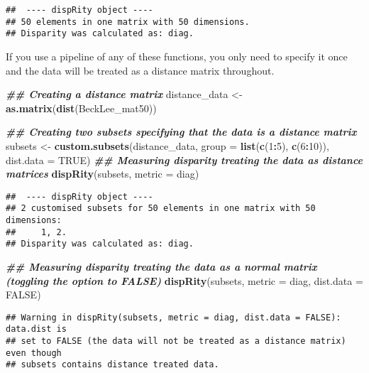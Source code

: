 \documentclass[
]{book}
\newenvironment{Shaded}{\begin{snugshade}}{\end{snugshade}}
\newcommand{\AttributeTok}[1]{\textcolor[rgb]{0.13,0.29,0.53}{#1}}
\newcommand{\ConstantTok}[1]{\textcolor[rgb]{0.56,0.35,0.01}{#1}}
\newcommand{\DecValTok}[1]{\textcolor[rgb]{0.00,0.00,0.81}{#1}}
\newcommand{\DocumentationTok}[1]{\textcolor[rgb]{0.56,0.35,0.01}{\textbf{\textit{#1}}}}
\newcommand{\FunctionTok}[1]{\textcolor[rgb]{0.13,0.29,0.53}{\textbf{#1}}}
\newcommand{\NormalTok}[1]{#1}
\newcommand{\OtherTok}[1]{\textcolor[rgb]{0.56,0.35,0.01}{#1}}
\newcommand{\SpecialCharTok}[1]{\textcolor[rgb]{0.81,0.36,0.00}{\textbf{#1}}}
\begin{document}
\begin{verbatim}
##  ---- dispRity object ---- 
## 50 elements in one matrix with 50 dimensions.
## Disparity was calculated as: diag.
\end{verbatim}

If you use a pipeline of any of these functions, you only need to specify it once and the data will be treated as a distance matrix throughout.

\begin{Shaded}
\begin{Highlighting}[]
\DocumentationTok{\#\# Creating a distance matrix}
\NormalTok{distance\_data }\OtherTok{\textless{}{-}} \FunctionTok{as.matrix}\NormalTok{(}\FunctionTok{dist}\NormalTok{(BeckLee\_mat50))}

\DocumentationTok{\#\# Creating two subsets specifying that the data is a distance matrix}
\NormalTok{subsets }\OtherTok{\textless{}{-}} \FunctionTok{custom.subsets}\NormalTok{(distance\_data, }\AttributeTok{group =} \FunctionTok{list}\NormalTok{(}\FunctionTok{c}\NormalTok{(}\DecValTok{1}\SpecialCharTok{:}\DecValTok{5}\NormalTok{), }\FunctionTok{c}\NormalTok{(}\DecValTok{6}\SpecialCharTok{:}\DecValTok{10}\NormalTok{)), }\AttributeTok{dist.data =} \ConstantTok{TRUE}\NormalTok{)}
\DocumentationTok{\#\# Measuring disparity treating the data as distance matrices}
\FunctionTok{dispRity}\NormalTok{(subsets, }\AttributeTok{metric =}\NormalTok{ diag)}
\end{Highlighting}
\end{Shaded}

\begin{verbatim}
##  ---- dispRity object ---- 
## 2 customised subsets for 50 elements in one matrix with 50 dimensions:
##     1, 2.
## Disparity was calculated as: diag.
\end{verbatim}

\begin{Shaded}
\begin{Highlighting}[]
\DocumentationTok{\#\# Measuring disparity treating the data as a normal matrix (toggling the option to FALSE)}
\FunctionTok{dispRity}\NormalTok{(subsets, }\AttributeTok{metric =}\NormalTok{ diag, }\AttributeTok{dist.data =} \ConstantTok{FALSE}\NormalTok{)}
\end{Highlighting}
\end{Shaded}

\begin{verbatim}
## Warning in dispRity(subsets, metric = diag, dist.data = FALSE): data.dist is
## set to FALSE (the data will not be treated as a distance matrix) even though
## subsets contains distance treated data.
\end{verbatim}
\end{document}
